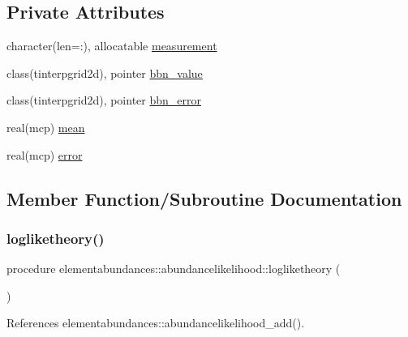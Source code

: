 \subsection*{Private Attributes}
\begin{DoxyCompactItemize}
\item 
character(len=\+:), allocatable \mbox{\hyperlink{structelementabundances_1_1abundancelikelihood_abf2dfae506f6d987ef304a65731c668e}{measurement}}
\item 
class(tinterpgrid2d), pointer \mbox{\hyperlink{structelementabundances_1_1abundancelikelihood_a50e9b25cb4dc118ff610718e4b5ba8da}{bbn\+\_\+value}}
\item 
class(tinterpgrid2d), pointer \mbox{\hyperlink{structelementabundances_1_1abundancelikelihood_a382d851aa344dcf09d7d03838c0224bf}{bbn\+\_\+error}}
\item 
real(mcp) \mbox{\hyperlink{structelementabundances_1_1abundancelikelihood_a5b083c4554f70896e0de4cf50eb5f631}{mean}}
\item 
real(mcp) \mbox{\hyperlink{structelementabundances_1_1abundancelikelihood_a148c4776ff55e0932adafad45d7c6a06}{error}}
\end{DoxyCompactItemize}


\subsection{Member Function/\+Subroutine Documentation}
\mbox{\label{structelementabundances_1_1abundancelikelihood_a9aaf4de54cb342269426810a8eed5718}} 
\subsubsection{\texorpdfstring{logliketheory()}{logliketheory()}}
{\footnotesize\ttfamily procedure elementabundances\+::abundancelikelihood\+::logliketheory (\begin{DoxyParamCaption}{ }\end{DoxyParamCaption})\hspace{0.3cm}{\ttfamily [private]}}



References elementabundances\+::abundancelikelihood\+\_\+add().

